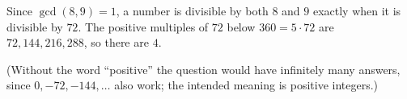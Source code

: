 Since $\gcd(8,9)=1$, a number is divisible by both $8$ and $9$ exactly when it is divisible by $72$. The positive multiples of $72$ below $360=5\cdot72$ are $72,144,216,288$, so there are $\boxed{4}$.

(Without the word ``positive'' the question would have infinitely many answers, since $0,-72,-144,\dots$ also work; the intended meaning is positive integers.)
